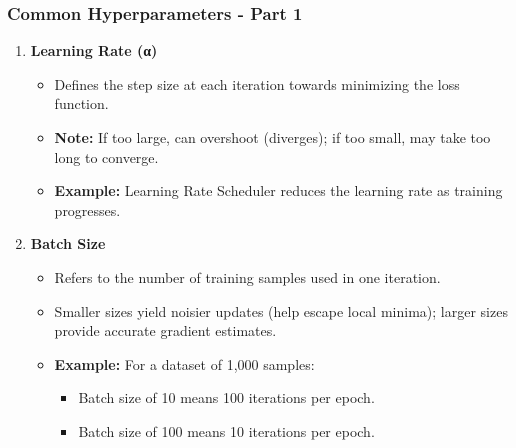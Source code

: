 \documentclass[aspectratio=169]{beamer}
\begin{document}
\begin{frame}[fragile]
    \frametitle{Common Hyperparameters - Part 1}
    \begin{enumerate}
        \item \textbf{Learning Rate (α)}
        \begin{itemize}
            \item Defines the step size at each iteration towards minimizing the loss function.
            \item \textbf{Note:} If too large, can overshoot (diverges); if too small, may take too long to converge.
            \item \textbf{Example:} Learning Rate Scheduler reduces the learning rate as training progresses.
        \end{itemize}
        
        \item \textbf{Batch Size}
        \begin{itemize}
            \item Refers to the number of training samples used in one iteration.
            \item Smaller sizes yield noisier updates (help escape local minima); larger sizes provide accurate gradient estimates.
            \item \textbf{Example:} For a dataset of 1,000 samples:
            \begin{itemize}
                \item Batch size of 10 means 100 iterations per epoch.
                \item Batch size of 100 means 10 iterations per epoch.
            \end{itemize}
        \end{itemize}
    \end{enumerate}
\end{frame}
\end{document}
